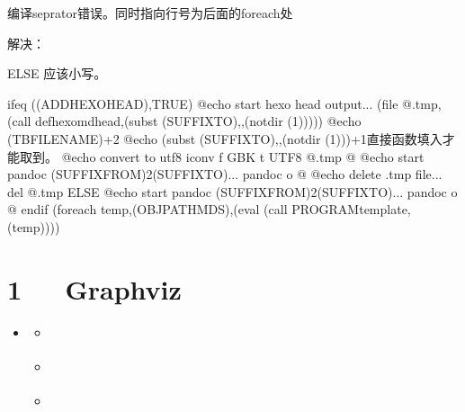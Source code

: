 \documentclass[letterpaper,12pt,english]{sphinxmanual}
\begin{document}
编译seprator错误。同时指向行号为后面的foreach处

解决：

ELSE 应该小写。

\begin{sphinxVerbatim}[commandchars=\\\{\}]
ifeq (\PYGZdl{}(ADD\PYGZus{}HEXO\PYGZus{}HEAD),TRUE)
  @echo start hexo head output...
  \PYGZdl{}\PYGZdl{}(file \PYGZgt{}\PYGZdl{}\PYGZdl{}@.tmp,\PYGZdl{}\PYGZdl{}(call def\PYGZus{}hexo\PYGZus{}md\PYGZus{}head,\PYGZdl{}(subst \PYGZdl{}(SUFFIX\PYGZus{}TO),,\PYGZdl{}(notdir \PYGZdl{}(1)))))
\PYGZsh{} @echo \PYGZdl{}\PYGZdl{}(TBFILENAME)+2
\PYGZsh{} @echo \PYGZdl{}(subst \PYGZdl{}(SUFFIX\PYGZus{}TO),,\PYGZdl{}(notdir \PYGZdl{}(1)))+1\PYGZsh{}直接函数填入才能取到。
  @echo convert to utf8
  iconv \PYGZhy{}f GBK \PYGZhy{}t UTF\PYGZhy{}8 \PYGZdl{}\PYGZdl{}@.tmp \PYGZgt{}\PYGZdl{}\PYGZdl{}@
  @echo start pandoc \PYGZdl{}(SUFFIX\PYGZus{}FROM)2\PYGZdl{}(SUFFIX\PYGZus{}TO)...
  pandoc \PYGZdl{}\PYGZdl{}\PYGZlt{} \PYGZhy{}o \PYGZhy{} \PYGZgt{}\PYGZgt{}\PYGZdl{}\PYGZdl{}@
  @echo delete .tmp file...
  del \PYGZdl{}\PYGZdl{}@.tmp
ELSE
  @echo start pandoc \PYGZdl{}(SUFFIX\PYGZus{}FROM)2\PYGZdl{}(SUFFIX\PYGZus{}TO)...
  pandoc \PYGZdl{}\PYGZdl{}\PYGZlt{} \PYGZhy{}o \PYGZdl{}\PYGZdl{}@
endif
\PYGZdl{}(foreach temp,\PYGZdl{}(OBJ\PYGZus{}PATH\PYGZus{}MDS),\PYGZdl{}(eval \PYGZdl{}(call PROGRAM\PYGZus{}template,\PYGZdl{}(temp))))
\end{sphinxVerbatim}


\chapter{1   Graphviz}
\label{\detokenize{001software/001install/Graphviz:graphviz}}\label{\detokenize{001software/001install/Graphviz::doc}}
\begin{sphinxShadowBox}
\begin{itemize}
\item {} 
\label{\detokenize{001software/001install/Graphviz:id2}}{\hyperref[\detokenize{001software/001install/Graphviz:graphviz}]{}}
\begin{itemize}
\item {} 
\label{\detokenize{001software/001install/Graphviz:id3}}{\hyperref[\detokenize{001software/001install/Graphviz:install}]{}}

\item {} 
\label{\detokenize{001software/001install/Graphviz:id4}}{\hyperref[\detokenize{001software/001install/Graphviz:tips}]{}}

\item {} 
\label{\detokenize{001software/001install/Graphviz:id5}}{\hyperref[\detokenize{001software/001install/Graphviz:faq}]{}}

\end{itemize}

\end{itemize}
\end{sphinxShadowBox}
\end{document}
